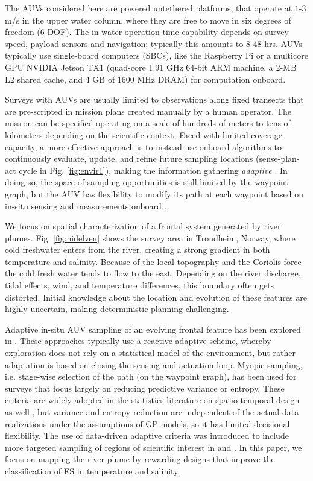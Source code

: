 \documentclass[aoas]{imsart}
\begin{document}
The AUVs considered here are powered untethered platforms, that
operate at $1$-$3$ m/s in the upper water column, where they are free
to move in six degrees of freedom (6 DOF). The in-water operation time
capability depends on survey speed, payload sensors and navigation;
typically this amounts to 8-48 hrs. AUVs typically use single-board
computers (SBCs), like the Raspberry Pi or a multicore GPU NVIDIA
Jetson TX1 (quad-core 1.91 GHz 64-bit ARM machine, a 2-MB L2 shared
cache, and 4 GB of 1600 MHz DRAM) for computation onboard.

Surveys with AUVs are usually limited to observations along fixed
transects that are pre-scripted in mission plans created manually by a
human operator. The mission can be specified operating on a scale of
hundreds of meters to tens of kilometers depending on the scientific
context. Faced with limited coverage capacity, a more effective
approach is to instead use onboard algorithms to continuously
evaluate, update, and refine future sampling locations (sense-plan-act
cycle in Fig. \ref{fig:envir1}), making the information gathering
\emph{adaptive} \citep{das11b,Das2015,fossuminformation,fossum18b}.
In doing so, the space of sampling opportunities is still limited by
the waypoint graph, but the AUV has flexibility to modify its path at
each waypoint based on in-situ sensing and measurements onboard
\citep{py10,Rajan12,Rajan12b}.

We focus on spatial characterization of a frontal system generated by
river plumes. Fig. \ref{fig:nidelven} shows the survey area in
Trondheim, Norway, where cold freshwater enters from the river,
creating a strong gradient in both temperature and salinity. Because
of the local topography and the Coriolis force the cold fresh water
tends to flow to the east. Depending on the river discharge, tidal
effects, wind, and temperature differences, this boundary often gets
distorted. Initial knowledge about the location and evolution of these
features are highly uncertain, making deterministic planning
challenging.

Adaptive in-situ AUV sampling of an evolving frontal feature has been
explored in \cite{fronts11,Zhang2012,Pinto2018,costa19}. These
approaches typically use a reactive-adaptive scheme, whereby
exploration does not rely on a statistical model of the environment,
but rather adaptation is based on closing the sensing and actuation
loop. Myopic sampling, i.e. stage-wise selection of the path (on the
waypoint graph), has been used for surveys
\citep{singh2009efficient,Binney2013} that focus largely on reducing
predictive variance or entropy. These criteria are widely adopted in
the statistics literature on spatio-temporal design as well
\cite{bueso1998state,zidek2019monitoring}, but variance and entropy
reduction are independent of the actual data realizations under the
assumptions of GP models, so it has limited
decisional flexibility. The use of data-driven adaptive criteria
was introduced to include more targeted sampling of regions of
scientific interest in \cite{Low2009} and \cite{fossuminformation}. In
this paper, we focus on mapping the river plume by rewarding designs
that improve the classification of ES in temperature and salinity.
\end{document}
